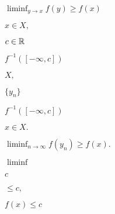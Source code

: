 \documentclass[10pt]{book}
\begin{document}
\begin{mdSnippets}
\begin{mdInlineSnippet}[8d165ac5c24372382035b830c7d8328c]%
$\liminf_{y \to x} f(y) \ge f(x)$\end{mdInlineSnippet}%
\begin{mdInlineSnippet}%
$x \in X,$\end{mdInlineSnippet}%
\begin{mdInlineSnippet}%
$c \in \mathbb{R}$\end{mdInlineSnippet}%
\begin{mdInlineSnippet}[2e76e87b3447a2eda956d861af860dd2]%
$f^{-1}([-\infty, c])$\end{mdInlineSnippet}%
\begin{mdInlineSnippet}[412bd1def2f1b61da9169d88e6c8b9e9]%
$X,$\end{mdInlineSnippet}%
\begin{mdInlineSnippet}%
$\{y_n\}$\end{mdInlineSnippet}%
\begin{mdInlineSnippet}[2e76e87b3447a2eda956d861af860dd2]%
$f^{-1}([-\infty, c])$\end{mdInlineSnippet}%
\begin{mdInlineSnippet}[94a3ac7461d7486024cf3d570269399e]%
$x \in X.$\end{mdInlineSnippet}%
\begin{mdInlineSnippet}[1465ad70ebf69c16861e175d6e139742]%
$\liminf_{n \to \infty} f(y_n) \ge f(x).$\end{mdInlineSnippet}%
\begin{mdInlineSnippet}[453958d8465f2429dc41b22f010c89dd]%
$\liminf$\end{mdInlineSnippet}%
\begin{mdInlineSnippet}[4a8a08f09d37b73795649038408b5f33]%
$c$\end{mdInlineSnippet}%
\begin{mdInlineSnippet}%
$\le c,$\end{mdInlineSnippet}%
\begin{mdInlineSnippet}[495b622e824b97b8d8e1d1981d5dbb2d]%
$f(x) \le c$\end{mdInlineSnippet}%

\end{mdSnippets}
\end{document}
